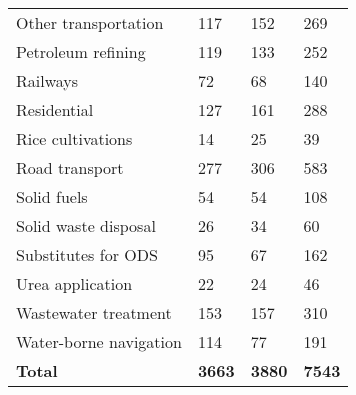 \documentclass[a4paper]{article}
\begin{document}
\begin{table}[!ht]
\begin{tabular}{llll}
        Other transportation & 117 & 152 & 269 \\ 
        Petroleum refining & 119 & 133 & 252 \\ 
        Railways & 72 & 68 & 140 \\ 
        Residential & 127 & 161 & 288 \\ 
        Rice cultivations & 14 & 25 & 39 \\ 
        Road transport & 277 & 306 & 583 \\ 
        Solid fuels & 54 & 54 & 108 \\ 
        Solid waste disposal & 26 & 34 & 60 \\ 
        Substitutes for ODS & 95 & 67 & 162 \\ 
        Urea application & 22 & 24 & 46 \\ 
        Wastewater treatment & 153 & 157 & 310 \\ 
        Water-borne navigation & 114 & 77 & 191 \\ \hline
        \textbf{Total} & \textbf{3663} & \textbf{3880} & \textbf{7543} \\ \hline
    \end{tabular}
    \label{tab:breaks_by_sector}
\end{table}
\end{document}
